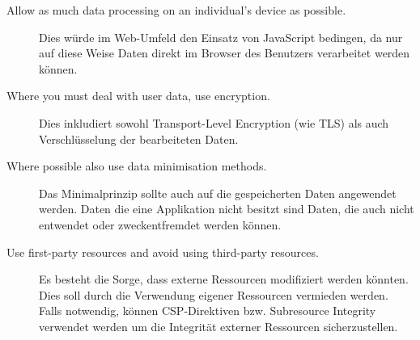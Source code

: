 \begin{description}
	\item[Allow as much data processing on an individual’s device as possible.] Dies würde im Web-Umfeld den Einsatz von JavaScript bedingen, da nur auf diese Weise Daten direkt im Browser des Benutzers verarbeitet werden können.
	\item[Where you must deal with user data, use encryption.] Dies inkludiert sowohl Transport-Level Encryption (wie TLS) als auch Verschlüsselung der bearbeiteten Daten.
	\item[Where possible also use data minimisation methods.] Das Minimalprinzip sollte auch auf die gespeicherten Daten angewendet werden. Daten die eine Applikation nicht besitzt sind Daten, die auch nicht entwendet oder zweckentfremdet werden können.
	\item[Use first-party resources and avoid using third-party resources.] Es besteht die Sorge, dass externe Ressourcen modifiziert werden könnten. Dies soll durch die Verwendung eigener Ressourcen vermieden werden. Falls notwendig, können CSP-Direktiven bzw. Subresource Integrity verwendet werden um die Integrität externer Ressourcen sicherzustellen.
\end{description}
